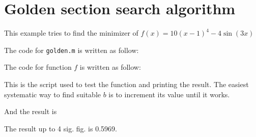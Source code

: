 \documentclass{article}
\begin{document}
\section*{Golden section search algorithm}

This example tries to find the minimizer of $f(x) = 10(x-1)^4 - 4\sin(3x)$

The code for \lstinline{golden.m} is written as follow:



The code for function $f$ is written as follow:



This is the script used to test the function and printing the result. The easiest systematic way to find suitable $b$ is to increment its value until it works.



And the result is 



The result up to 4 sig. fig. is 0.5969.
\end{document}
